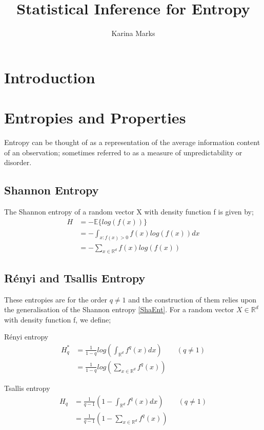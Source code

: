 \documentclass{article}
\title{Statistical Inference for Entropy}
\author{Karina Marks}
\begin{document}
\maketitle
\section{Introduction}



\section{Entropies and Properties}

Entropy can be thought of as a representation of the average information content of an observation; sometimes referred to as a measure of unpredictability or disorder. 

\subsection{Shannon Entropy}
The Shannon entropy of a random vector X with density function f is given by;
\begin{align} 
H &= - \mathbb{E} \{log(f(x))\} \nonumber \\
&= - \int_{x : f(x) > 0} f(x) log(f(x)) dx \nonumber \\
&= - \sum_{x \in \mathbb{R}^{d}} f(x) log(f(x)) \label{ShaEnt}
\end{align} 

\subsection{ R\'enyi and Tsallis Entropy}
These entropies are for the order $q \neq 1$ and the construction of them relies upon the generalisation of the Shannon entropy \ref{ShaEnt}. For a random vector $X \in \mathbb{R}^d$ with density function f, we define;

R\'enyi entropy
\begin{align} 
H_{q}^{*} &= \frac{1}{1-q} log \left( \int_{\mathbb{R}^d} f^q (x) dx \right) \quad  \quad (q \neq 1) \label{RenEnt} \\
&=  \frac{1}{1-q} log \left( \sum_{x \in \mathbb{R}^{d}} f^q (x) \right) \nonumber 
\end{align}

Tsallis entropy
\begin{align} 
H_{q} &= \frac{1}{q-1} \left(1 - \int_{\mathbb{R}^d} f^q (x) dx \right)  \quad  \quad (q \neq 1) \label{TsaEnt} \\
&=  \frac{1}{q-1} \left(1 - \sum_{x \in \mathbb{R}^d} f^q (x) \right) \nonumber 
\end{align}
\end{document}
